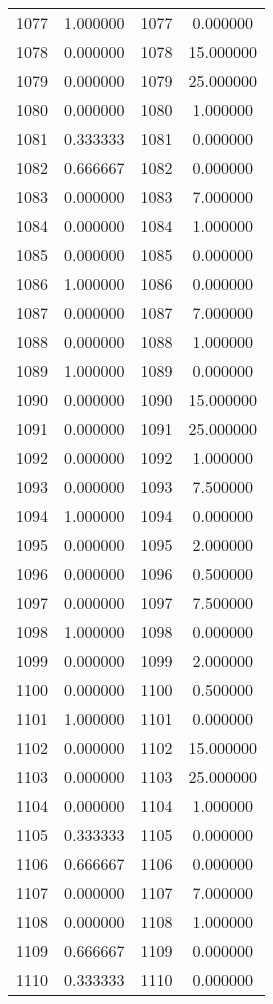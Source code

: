 \documentclass[12pt]{article}
\begin{document}
\begin{longtable}{@{}cccc@{}}
1077 & 1.000000 & 1077 & 0.000000 \\
1078 & 0.000000 & 1078 & 15.000000 \\
1079 & 0.000000 & 1079 & 25.000000 \\
1080 & 0.000000 & 1080 & 1.000000 \\
1081 & 0.333333 & 1081 & 0.000000 \\
1082 & 0.666667 & 1082 & 0.000000 \\
1083 & 0.000000 & 1083 & 7.000000 \\
1084 & 0.000000 & 1084 & 1.000000 \\
1085 & 0.000000 & 1085 & 0.000000 \\
1086 & 1.000000 & 1086 & 0.000000 \\
1087 & 0.000000 & 1087 & 7.000000 \\
1088 & 0.000000 & 1088 & 1.000000 \\
1089 & 1.000000 & 1089 & 0.000000 \\
1090 & 0.000000 & 1090 & 15.000000 \\
1091 & 0.000000 & 1091 & 25.000000 \\
1092 & 0.000000 & 1092 & 1.000000 \\
1093 & 0.000000 & 1093 & 7.500000 \\
1094 & 1.000000 & 1094 & 0.000000 \\
1095 & 0.000000 & 1095 & 2.000000 \\
1096 & 0.000000 & 1096 & 0.500000 \\
1097 & 0.000000 & 1097 & 7.500000 \\
1098 & 1.000000 & 1098 & 0.000000 \\
1099 & 0.000000 & 1099 & 2.000000 \\
1100 & 0.000000 & 1100 & 0.500000 \\
1101 & 1.000000 & 1101 & 0.000000 \\
1102 & 0.000000 & 1102 & 15.000000 \\
1103 & 0.000000 & 1103 & 25.000000 \\
1104 & 0.000000 & 1104 & 1.000000 \\
1105 & 0.333333 & 1105 & 0.000000 \\
1106 & 0.666667 & 1106 & 0.000000 \\
1107 & 0.000000 & 1107 & 7.000000 \\
1108 & 0.000000 & 1108 & 1.000000 \\
1109 & 0.666667 & 1109 & 0.000000 \\
1110 & 0.333333 & 1110 & 0.000000 \\

\end{longtable}
\end{document}
